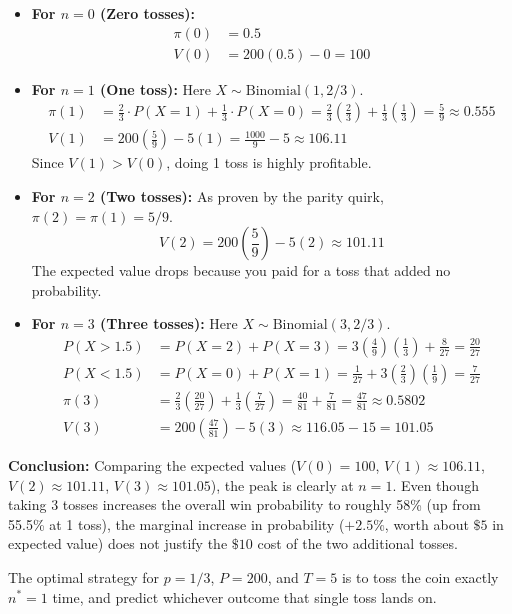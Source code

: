 \begin{itemize}
    \item \textbf{For $n = 0$ (Zero tosses):}
    \begin{align*}
        \pi(0) &= 0.5 \\
        V(0) &= 200(0.5) - 0 = 100
    \end{align*}
    
    \item \textbf{For $n = 1$ (One toss):} Here $X \sim \text{Binomial}(1, 2/3)$.
    \begin{align*}
        \pi(1) &= \frac{2}{3} \cdot P(X=1) + \frac{1}{3} \cdot P(X=0) = \frac{2}{3}\left(\frac{2}{3}\right) + \frac{1}{3}\left(\frac{1}{3}\right) = \frac{5}{9} \approx 0.555 \\
        V(1) &= 200\left(\frac{5}{9}\right) - 5(1) = \frac{1000}{9} - 5 \approx 106.11
    \end{align*}
    Since $V(1) > V(0)$, doing 1 toss is highly profitable.
    
    \item \textbf{For $n = 2$ (Two tosses):} As proven by the parity quirk, $\pi(2) = \pi(1) = 5/9$.
    \begin{equation*}
        V(2) = 200\left(\frac{5}{9}\right) - 5(2) \approx 101.11
    \end{equation*}
    The expected value drops because you paid for a toss that added no probability.
    
    \item \textbf{For $n = 3$ (Three tosses):} Here $X \sim \text{Binomial}(3, 2/3)$.
    \begin{align*}
        P(X > 1.5) &= P(X=2) + P(X=3) = 3\left(\frac{4}{9}\right)\left(\frac{1}{3}\right) + \frac{8}{27} = \frac{20}{27} \\
        P(X < 1.5) &= P(X=0) + P(X=1) = \frac{1}{27} + 3\left(\frac{2}{3}\right)\left(\frac{1}{9}\right) = \frac{7}{27} \\
        \pi(3) &= \frac{2}{3}\left(\frac{20}{27}\right) + \frac{1}{3}\left(\frac{7}{27}\right) = \frac{40}{81} + \frac{7}{81} = \frac{47}{81} \approx 0.5802 \\
        V(3) &= 200\left(\frac{47}{81}\right) - 5(3) \approx 116.05 - 15 = 101.05
    \end{align*}
\end{itemize}

\textbf{Conclusion:} 
Comparing the expected values ($V(0) = 100$, $V(1) \approx 106.11$, $V(2) \approx 101.11$, $V(3) \approx 101.05$), the peak is clearly at $n=1$. Even though taking 3 tosses increases the overall win probability to roughly 58\% (up from 55.5\% at 1 toss), the marginal increase in probability ($+2.5\%$, worth about $\$5$ in expected value) does not justify the $\$10$ cost of the two additional tosses. 

The optimal strategy for $p=1/3$, $P=200$, and $T=5$ is to toss the coin exactly $n^* = 1$ time, and predict whichever outcome that single toss lands on.